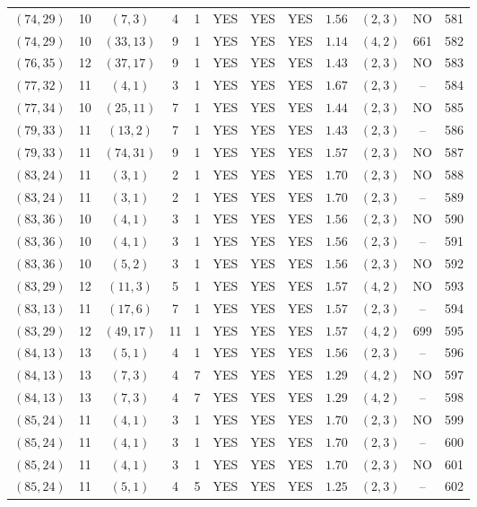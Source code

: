 \begin{longtable}{|c|c|c|c|c|c|c|c|c|c|c|c|}
$(74,29)$ & 10 & $(7,3)$ & 4 & 1 & YES & YES & YES & $1.56$ & $(2,3)$ & NO & 581\\
$(74,29)$ & 10 & $(33,13)$ & 9 & 1 & YES & YES & YES & $1.14$ & $(4,2)$ & 661 & 582\\
$(76,35)$ & 12 & $(37,17)$ & 9 & 1 & YES & YES & YES & $1.43$ & $(2,3)$ & NO & 583\\
$(77,32)$ & 11 & $(4,1)$ & 3 & 1 & YES & YES & YES & $1.67$ & $(2,3)$ & -- & 584\\
$(77,34)$ & 10 & $(25,11)$ & 7 & 1 & YES & YES & YES & $1.44$ & $(2,3)$ & NO & 585\\
$(79,33)$ & 11 & $(13,2)$ & 7 & 1 & YES & YES & YES & $1.43$ & $(2,3)$ & -- & 586\\
$(79,33)$ & 11 & $(74,31)$ & 9 & 1 & YES & YES & YES & $1.57$ & $(2,3)$ & NO & 587\\
$(83,24)$ & 11 & $(3,1)$ & 2 & 1 & YES & YES & YES & $1.70$ & $(2,3)$ & NO & 588\\
$(83,24)$ & 11 & $(3,1)$ & 2 & 1 & YES & YES & YES & $1.70$ & $(2,3)$ & -- & 589\\
$(83,36)$ & 10 & $(4,1)$ & 3 & 1 & YES & YES & YES & $1.56$ & $(2,3)$ & NO & 590\\
$(83,36)$ & 10 & $(4,1)$ & 3 & 1 & YES & YES & YES & $1.56$ & $(2,3)$ & -- & 591\\
$(83,36)$ & 10 & $(5,2)$ & 3 & 1 & YES & YES & YES & $1.56$ & $(2,3)$ & NO & 592\\
$(83,29)$ & 12 & $(11,3)$ & 5 & 1 & YES & YES & YES & $1.57$ & $(4,2)$ & NO & 593\\
$(83,13)$ & 11 & $(17,6)$ & 7 & 1 & YES & YES & YES & $1.57$ & $(2,3)$ & -- & 594\\
$(83,29)$ & 12 & $(49,17)$ & 11 & 1 & YES & YES & YES & $1.57$ & $(4,2)$ & 699 & 595\\
$(84,13)$ & 13 & $(5,1)$ & 4 & 1 & YES & YES & YES & $1.56$ & $(2,3)$ & -- & 596\\
$(84,13)$ & 13 & $(7,3)$ & 4 & 7 & YES & YES & YES & $1.29$ & $(4,2)$ & NO & 597\\
$(84,13)$ & 13 & $(7,3)$ & 4 & 7 & YES & YES & YES & $1.29$ & $(4,2)$ & -- & 598\\
$(85,24)$ & 11 & $(4,1)$ & 3 & 1 & YES & YES & YES & $1.70$ & $(2,3)$ & NO & 599\\
$(85,24)$ & 11 & $(4,1)$ & 3 & 1 & YES & YES & YES & $1.70$ & $(2,3)$ & -- & 600\\
$(85,24)$ & 11 & $(4,1)$ & 3 & 1 & YES & YES & YES & $1.70$ & $(2,3)$ & NO & 601\\
$(85,24)$ & 11 & $(5,1)$ & 4 & 5 & YES & YES & YES & $1.25$ & $(2,3)$ & -- & 602\\

\end{longtable}

